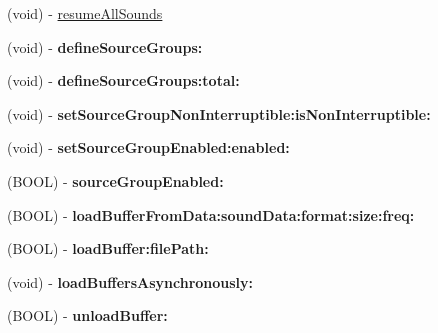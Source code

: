 \begin{DoxyCompactItemize}
\item 
(void) -\/ \hyperlink{interfaceCDSoundEngine_a307f8d30e7fb5c7f29edbaea19709741}{resume\+All\+Sounds}
\item 
\mbox{\label{interfaceCDSoundEngine_a5940b79595deabff5cab67987133c518}} 
(void) -\/ {\bfseries define\+Source\+Groups\+:}
\item 
\mbox{\label{interfaceCDSoundEngine_a34ecd46964f13229c005cec18092be9f}} 
(void) -\/ {\bfseries define\+Source\+Groups\+:total\+:}
\item 
\mbox{\label{interfaceCDSoundEngine_afd29660acffd4fd1f7a667e4a389f84a}} 
(void) -\/ {\bfseries set\+Source\+Group\+Non\+Interruptible\+:is\+Non\+Interruptible\+:}
\item 
\mbox{\label{interfaceCDSoundEngine_ae791fe92a23a27d282fff5108ed8b8c0}} 
(void) -\/ {\bfseries set\+Source\+Group\+Enabled\+:enabled\+:}
\item 
\mbox{\label{interfaceCDSoundEngine_a9e73b1f9ce070579469e18da0fdabf5a}} 
(B\+O\+OL) -\/ {\bfseries source\+Group\+Enabled\+:}
\item 
\mbox{\label{interfaceCDSoundEngine_ad55fe00fbd360d99e3832047dc6f668c}} 
(B\+O\+OL) -\/ {\bfseries load\+Buffer\+From\+Data\+:sound\+Data\+:format\+:size\+:freq\+:}
\item 
\mbox{\label{interfaceCDSoundEngine_a6b28868545d700c3cc40d087527c6012}} 
(B\+O\+OL) -\/ {\bfseries load\+Buffer\+:file\+Path\+:}
\item 
\mbox{\label{interfaceCDSoundEngine_a8ab83905d8865c75c8055871f5c84fdd}} 
(void) -\/ {\bfseries load\+Buffers\+Asynchronously\+:}
\item 
\mbox{\label{interfaceCDSoundEngine_a2a245d09bd9aa88de752c97dd889662e}} 
(B\+O\+OL) -\/ {\bfseries unload\+Buffer\+:}
\item 
\mbox{\label{interfaceCDSoundEngine_a3207754d8ae7d5a63dc03fd43b698d12}} 

\end{DoxyCompactItemize}
